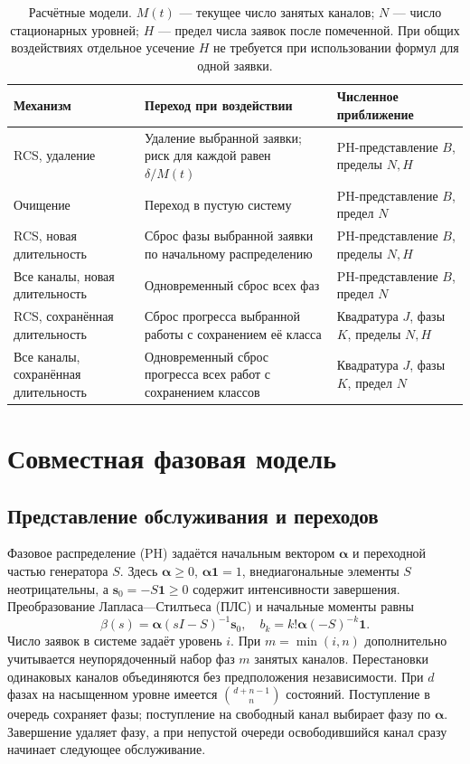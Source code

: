 \documentclass[a4paper,12pt]{article}
\begin{document}
\begin{table}[!htbp]
\centering\small
\begin{tabular}{@{}p{3.6cm}p{6.0cm}p{5.0cm}@{}}
\toprule
Механизм & Переход при воздействии & Численное приближение \\
\midrule
RCS, удаление & Удаление выбранной заявки; риск для каждой равен \(\delta/M(t)\) & PH-представление \(B\), пределы \(N,H\) \\
Очищение & Переход в пустую систему & PH-представление \(B\), предел \(N\) \\
RCS, новая длительность & Сброс фазы выбранной заявки по начальному распределению & PH-представление \(B\), пределы \(N,H\) \\
Все каналы, новая длительность & Одновременный сброс всех фаз & PH-представление \(B\), предел \(N\) \\
RCS, сохранённая длительность & Сброс прогресса выбранной работы с сохранением её класса & Квадратура \(J\), фазы \(K\), пределы \(N,H\) \\
Все каналы, сохранённая длительность & Одновременный сброс прогресса всех работ с сохранением классов & Квадратура \(J\), фазы \(K\), предел \(N\) \\
\bottomrule
\end{tabular}
\caption{Расчётные модели. \(M(t)\) --- текущее число занятых каналов; \(N\) --- число стационарных уровней; \(H\) --- предел числа заявок после помеченной. При общих воздействиях отдельное усечение \(H\) не требуется при использовании формул для одной заявки.}
\label{tab:methods}
\end{table}

\section{Совместная фазовая модель}
\subsection{Представление обслуживания и переходов}
Фазовое распределение (PH) задаётся начальным вектором \(\boldsymbol\alpha\) и переходной частью генератора \(S\). Здесь \(\boldsymbol\alpha\ge0\), \(\boldsymbol\alpha\mathbf1=1\), внедиагональные элементы \(S\) неотрицательны, а \(\boldsymbol s_0=-S\mathbf1\ge0\) содержит интенсивности завершения. Преобразование Лапласа—Стилтьеса (ПЛС) и начальные моменты равны
\[
\beta(s)=\boldsymbol\alpha(sI-S)^{-1}\boldsymbol s_0,\quad
b_k=k!\boldsymbol\alpha(-S)^{-k}\mathbf1.
\]
Число заявок в системе задаёт уровень \(i\). При \(m=\min(i,n)\) дополнительно учитывается неупорядоченный набор фаз \(m\) занятых каналов. Перестановки одинаковых каналов объединяются без предположения независимости. При \(d\) фазах на насыщенном уровне имеется \(\binom{d+n-1}{n}\) состояний. Поступление в очередь сохраняет фазы; поступление на свободный канал выбирает фазу по \(\boldsymbol\alpha\). Завершение удаляет фазу, а при непустой очереди освободившийся канал сразу начинает следующее обслуживание.
\end{document}
